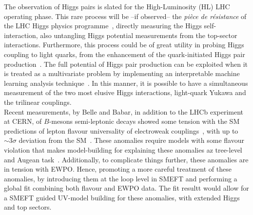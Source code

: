 The observation of Higgs pairs is slated for the High-Luminosity (HL) LHC operating phase. This rare process will be --if observed-- the {\it pi\`ece de r\'esistance} of the LHC Higgs physics programme~\cite{Bernius:2666331}, directly measuring the Higgs self-interaction, also untangling Higgs potential measurements from the top-sector interactions. Furthermore,  this process could be of great utility in probing Higgs coupling to light quarks, from the enhancement of the quark-initiated Higgs pair production~.  The full potential of Higgs pair production can be exploited when it is treated as a multivariate problem by implementing an interpretable machine learning analysis technique~\cite{Grojean:2020ech}. In this manner, it is possible to have a simultaneous measurement of the two most elusive Higgs interactions, light-quark Yukawa and the trilinear couplings.\\
Recent measurements, by Belle and Babar, in addition to the LHCb experiment at CERN, of $B$-mesons semi-leptonic decays showed some tension with the SM predictions of lepton flavour universality of electroweak couplings~\cite{Aaij:2014ora,Aaij:2017vbb,Aaij:2019wad,Abdesselam:2019wac,LHCb:2021trn}, with up to $\sim 3\sigma$ deviation from the SM~\cite{Chatrchyan:2013bka,Aaij:2017vad,Aaboud:2018mst,Aaij:2020nol}. These anomalies require models with some flavour violation that makes model-building for explaining these anomalies az tree-level and Augean task~\cite{DiLuzio:2017vat,Calibbi:2017qbu,Bordone:2017bld,Barbieri:2017tuq,Assad:2017iib,Heeck:2018ntp,Fornal:2018dqn,Crivellin:2018yvo,Crivellin:2019dwb,Bordone:2019uzc}. Additionally, to complicate things further, these anomalies are in tension with EWPO. Hence, promoting a more careful treatment of these anomalies, by introducing them at the loop level in SMEFT and performing a global fit combining both flavour and EWPO data. The fit resultt would allow for a SMEFT guided UV-model building for these anomalies, with extended Higgs and top sectors. \\

